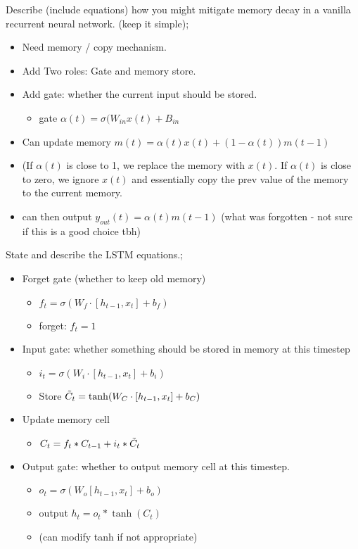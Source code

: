\documentclass{article}
\begin{document}
Describe (include equations) how you might mitigate memory decay in a vanilla recurrent neural network. (keep it simple); \begin{itemize} \item Need memory / copy mechanism.  \item Add Two roles: Gate and memory store. \item Add gate: whether the current input should be stored. \begin{itemize} \item gate $\alpha(t) = \sigma(W_{in}x(t)+B_{in}$ \end{itemize} \item Can update memory $m(t) = \alpha(t)x(t) + (1-\alpha(t))m(t-1)$ \item (If $\alpha(t)$ is close to 1, we replace the memory with $x(t)$. If $\alpha(t)$ is close to zero, we ignore $x(t)$ and essentially copy the prev value of the memory to the current memory. \item can then output $y_{out}(t)=\alpha(t)m(t-1)$ (what was forgotten - not sure if this is a good choice tbh) \end{itemize} 

State and describe the LSTM equations.; \begin{itemize} \item Forget gate (whether to keep old memory) \begin{itemize} \item $f_t = \sigma(W_f \cdot [h_{t-1}, x_t] + b_f)$ \item forget: $f_t = 1$ \end{itemize} \item Input gate: whether something should be stored in memory at this timestep \begin{itemize} \item $i_t = \sigma(W_i \cdot [h_{t-1}, x_t] + b_i)$ \item Store $\Tilde{C}_t = \tanh(W_C \cdot[h_{t-1}, x_t] + b_C)$ \end{itemize} \item Update memory cell \begin{itemize} \item $C_t = f_t * C_{t-1} + i_t * \Tilde{C}_t$ \end{itemize} \item Output gate: whether to output memory cell at this timestep. \begin{itemize} \item $o_t = \sigma(W_o[h_{t-1}, x_t] + b_o)$ \item output $h_t = o_t * \tanh(C_t)$ \item (can modify tanh if not appropriate) \end{itemize} \end{itemize}
\end{document}
